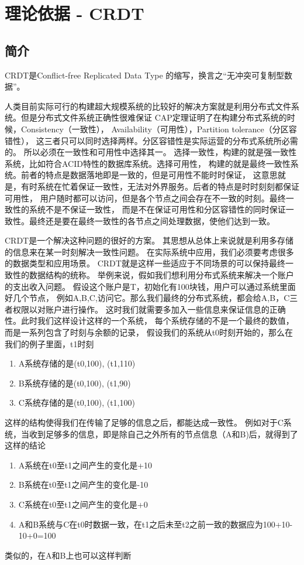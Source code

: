 \documentclass[11pt]{ctexart}
\begin{document}
\section{理论依据 - CRDT}
\subsection{简介}
CRDT是Conflict-free Replicated Data Type
的缩写，换言之“无冲突可复制型数据”。

人类目前实际可行的构建超大规模系统的比较好的解决方案就是利用分布式文件系统。但是分布式文件系统正确性很难保证
CAP定理证明了在构建分布式系统的时候，Consistency（一致性），
Availability（可用性），Partition tolerance（分区容错性），
这三者只可以同时选择两样。分区容错性是实际运营的分布式系统所必需的。
所以必须在一致性和可用性中选择其一。
选择一致性，构建的就是强一致性系统，比如符合ACID特性的数据库系统。选择可用性，
构建的就是最终一致性系统。前者的特点是数据落地即是一致的，但是可用性不能时时保证，
这意思就是，有时系统在忙着保证一致性，无法对外界服务。后者的特点是时时刻刻都保证可用性，
用户随时都可以访问，但是各个节点之间会存在不一致的时刻。最终一致性的系统不是不保证一致性，
而是不在保证可用性和分区容错性的同时保证一致性。最终还是要在最终一致性的各节点之间处理数据，使他们达到一致。

CRDT是一个解决这种问题的很好的方案。
其思想从总体上来说就是利用多存储的信息来在某一时刻解决一致性问题。
在实际系统中应用，我们必须要考虑很多的数据类型和应用场景。
CRDT就是这样一些适应于不同场景的可以保持最终一致性的数据结构的统称。
举例来说，假如我们想利用分布式系统来解决一个账户的支出收入问题。
假设这个账户是T，初始化有100块钱，用户可以通过系统里面好几个节点，
例如A,B,C,访问它。那么我们最终的分布式系统，都会给A,B，C三者权限以对账户进行操作。
这时我们就需要多加入一些信息来保证信息的正确性。此时我们这样设计这样的一个系统，
每个系统存储的不是一个最终的数值，而是一系列包含了时刻与余额的记录，
假设我们的系统从t0时刻开始的，那么在我们的例子里面，t1时刻
\begin{enumerate}
    \item A系统存储的是(t0,100), (t1,110)
    \item B系统存储的是(t0,100), (t1,90)
    \item C系统存储的是(t0,100), (t1,100)
\end{enumerate}
这样的结构使得我们在传输了足够的信息之后，都能达成一致性。
例如对于C系统，当收到足够多的信息，即是除自己之外所有的节点信息（A和B)后，就得到了这样的结论
\begin{enumerate}
    \item A系统在t0至t1之间产生的变化是+10
    \item B系统在t0至t1之间产生的变化是-10
    \item C系统在t0至t1之间产生的变化是+0
    \item A和B系统与C在t0时数据一致，在t1之后未至t2之前一致的数据应为100+10-10+0=100
\end{enumerate}
类似的，在A和B上也可以这样判断
\end{document}
